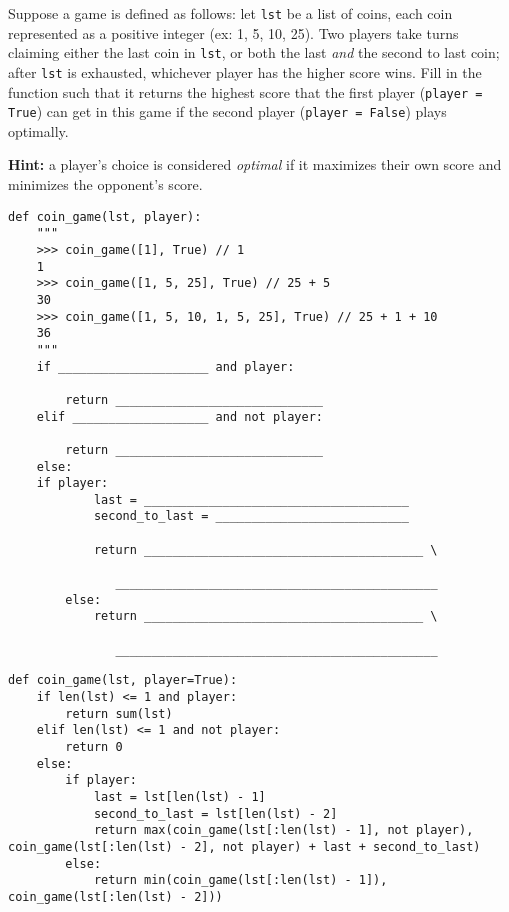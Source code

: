 \begin{blocksection}
\question Suppose a game is defined as follows: let \texttt{lst} be a list of coins, each coin represented as a positive integer (ex: 1, 5, 10, 25). Two players take turns claiming either the last coin in \texttt{lst}, or both the last \textit{and} the second to last coin; after \texttt{lst} is exhausted, whichever player has the higher score wins. Fill in the function such that it returns the highest score that the first player (\texttt{player = True}) can get in this game if the second player (\texttt{player = False}) plays optimally. 

\textbf{Hint:} a player's choice is considered \textit{optimal} if it maximizes their own score and minimizes the opponent's score.  \\

\begin{lstlisting}
def coin_game(lst, player):
    """
    >>> coin_game([1], True) // 1
    1
    >>> coin_game([1, 5, 25], True) // 25 + 5
    30
    >>> coin_game([1, 5, 10, 1, 5, 25], True) // 25 + 1 + 10
    36
    """
    if _____________________ and player:

        return _____________________________			
    elif ___________________ and not player:		

        return _____________________________			
    else:
	if player:			
            last = _____________________________________			
            second_to_last = ___________________________

            return _______________________________________ \

               _____________________________________________
        else:	
            return _______________________________________ \

               _____________________________________________
\end{lstlisting}
\end{blocksection}
\begin{blocksection}
\begin{solution}[0in]
\begin{lstlisting}
def coin_game(lst, player=True):
    if len(lst) <= 1 and player:
        return sum(lst)
    elif len(lst) <= 1 and not player:
        return 0
    else:
        if player:
            last = lst[len(lst) - 1]
            second_to_last = lst[len(lst) - 2]
            return max(coin_game(lst[:len(lst) - 1], not player), coin_game(lst[:len(lst) - 2], not player) + last + second_to_last)
        else:
            return min(coin_game(lst[:len(lst) - 1]), coin_game(lst[:len(lst) - 2]))
\end{lstlisting}
\end{solution}
\end{blocksection}

